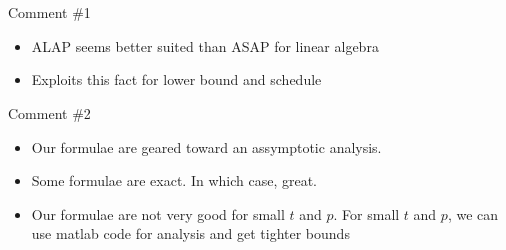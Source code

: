 \section{}

 \begin{frame}
   \tableofcontents
 \end{frame}


\begin{frame}

\footnotesize
\nocite{konig1988}
\nocite{COSNARD1988275}
\nocite{j38}
\nocite{Robert1989159}
\nocite{Kurzak2008}





  



\end{frame}






\begin{frame}

Comment \#1
\begin{itemize}
\item ALAP seems better suited than ASAP for linear algebra
\item Exploits this fact for lower bound and schedule
\end{itemize}

\vspace*{1cm}

Comment \#2
\begin{itemize}
\item Our formulae are geared toward an assymptotic analysis.
\item Some formulae are exact. In which case, great.
\item Our formulae are not very good for small $t$ and $p$. For small $t$ and $p$, we can use matlab code for analysis and get tighter bounds
\end{itemize}

\end{frame}






